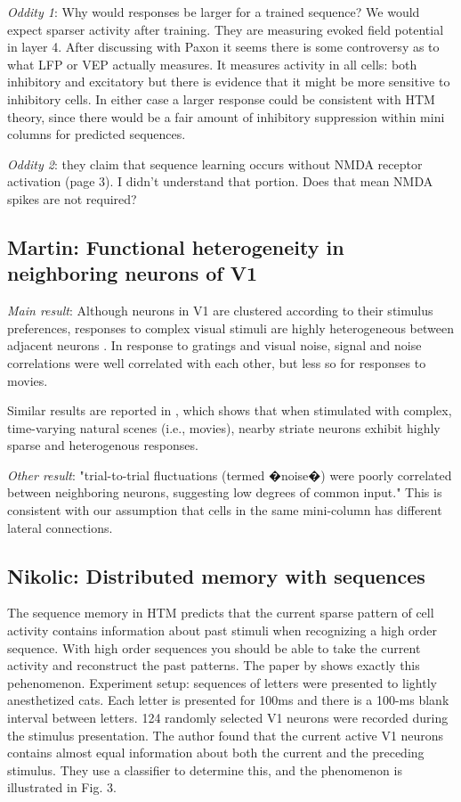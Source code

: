 \documentclass{article} %
\begin{document}
\emph{Oddity 1}: Why would responses be larger for a trained sequence? We would
expect
sparser activity after training. They are measuring evoked field potential in
layer 4. After discussing with Paxon it seems there is some controversy as to
what LFP or VEP actually measures. It measures activity in all cells: both
inhibitory and excitatory but there is evidence that it might be more sensitive
to inhibitory cells.  In either case a larger response could be consistent with
HTM theory, since there would be a fair amount of inhibitory suppression within
mini columns for predicted sequences.

\emph{Oddity 2}: they claim that sequence learning occurs without NMDA receptor
activation (page 3). I didn't understand that portion. Does that mean NMDA
spikes are not required?

\subsection{Martin: Functional heterogeneity in neighboring neurons of V1}
 
\emph{Main result}: Although neurons in V1 are clustered according to their stimulus
 preferences, responses to complex visual stimuli are highly heterogeneous between 
 adjacent neurons \cite{Martin2013}. In response to gratings and visual noise, signal and noise 
 correlations were well correlated with each other, but less so for responses to movies. 
 
 Similar results are reported in \cite{Yen2007}, which shows that when stimulated with 
 complex, time-varying natural scenes (i.e., movies), nearby striate neurons exhibit highly 
 sparse and heterogenous responses.
 
\emph{Other result}: "trial-to-trial fluctuations (termed �noise�) were poorly correlated between 
 neighboring neurons, suggesting low degrees of common input." This is consistent with 
 our assumption that cells in the same mini-column has different lateral connections.

\subsection{Nikolic: Distributed memory with sequences}

The sequence memory in HTM predicts that the current sparse pattern of cell
activity contains information about past stimuli when recognizing a high order
sequence. With high order sequences you should be able to take the current
activity and reconstruct the past patterns. The paper by \cite{Nikolic2009}
shows exactly this pehenomenon. Experiment setup: sequences of letters were
presented to lightly anesthetized cats. Each letter is presented for 100ms and
there is a 100-ms blank interval between letters. 124 randomly selected V1
neurons were recorded during the stimulus presentation. The author found that
the current active V1 neurons contains almost equal information about both the
current and the preceding stimulus.  They use a classifier to determine this,
and the phenomenon is illustrated in Fig. 3.
\end{document}
